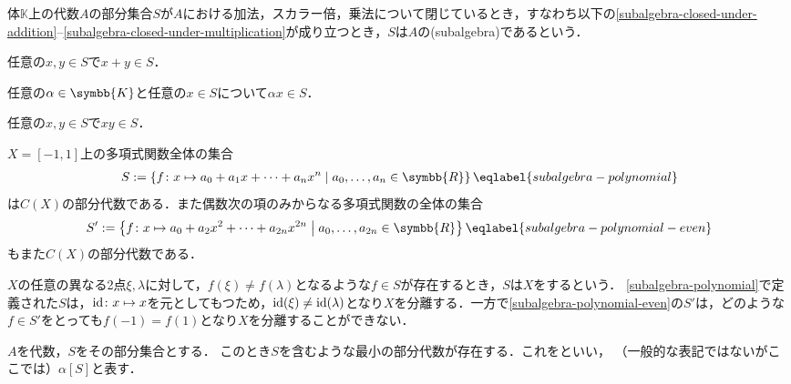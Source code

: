 \documentclass[../main.tex]{subfiles}
\begin{document}
\begin{thmbox}
\begin{definition}[（部分代数）]
体\(\mathbb{K}\)上の代数\(A\)の部分集合\(S\)が\(A\)における加法，スカラー倍，乗法について閉じているとき，すなわち以下の\ref{subalgebra-closed-under-addition}--\ref{subalgebra-closed-under-multiplication}が成り立つとき，\(S\)は\(A\)の(subalgebra)であるという．
\begin{conditions}
    \item\label{subalgebra-closed-under-addition} 任意の\(x, y \in S\)で\(x + y \in S\)．
    \item 任意の\(\alpha \in \symbb{K}\)と任意の\(x \in S\)について\(\alpha x \in S\)．
    \item\label{subalgebra-closed-under-multiplication} 任意の\(x, y \in S\)で\(xy \in S\)．
\end{conditions}
\end{definition}
\end{thmbox}

\begin{example} \(X = [-1, 1]\)上の多項式関数全体の集合
\begin{align}
    S := \left\{f\colon x \mapsto a_0 + a_1 x + \cdots + a_{n} x^{n} \relmiddle{|}  a_{0}, \ldots, a_{n} \in \symbb{R} \right\}
    \eqlabel{subalgebra-polynomial}
\end{align}
は\(C(X)\)の部分代数である．また偶数次の項のみからなる多項式関数の全体の集合
\begin{align}
    S' := \left\{f\colon x \mapsto a_0 + a_2 x^2 + \cdots + a_{2n} x^{2n} \relmiddle{|}  a_{0}, \ldots, a_{2n} \in \symbb{R} \right\}
    \eqlabel{subalgebra-polynomial-even}
\end{align}
もまた\(C(X)\)の部分代数である．
\end{example}

\(X\)の任意の異なる2点\(\xi, \lambda\)に対して，\(f(\xi) \neq f(\lambda)\)となるような\(f \in S\)が存在するとき，\(S\)は\(X\)をするという．
\eqref{subalgebra-polynomial}で定義された\(S\)は，\(\operatorname{id}\colon x \mapsto x\)を元としてもつため，\(\operatorname{id}(\xi) \neq \operatorname{id}(\lambda)\)となり\(X\)を分離する．一方で\eqref{subalgebra-polynomial-even}の\(S'\)は，どのような\(f\in S'\)をとっても\(f(-1) =  f(1)\)となり\(X\)を分離することができない．

\begin{thmbox}
\begin{definition}[生成される部分代数] \(A\)を代数，\(S\)をその部分集合とする．
このとき\(S\)を含むような最小の部分代数が存在する．これをといい，
（一般的な表記ではないがここでは）\(\alpha[S]\)と表す．
\end{definition}
\end{thmbox}
\end{document}
